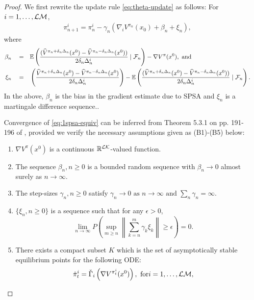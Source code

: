 \begin{proof}

We first rewrite the update rule \eqref{eq:theta-update} as follows: For $i=1,\ldots,\mathcal{L}\mathcal{M}$,
\begin{align}
\pi^{i}_{n+1}  =  \pi^{i}_n -  \gamma_n(\nabla_{i} V^{\pi_n}(x_0) + \beta_n + \xi_n), 
\label{eq:1spsa-equiv}
\end{align}
where 
\begin{align*}
\beta_n \quad= &\quad \mathbb{E}\left(\dfrac{(\widehat V^{\pi_n + \delta_n \Delta_n}(x^0) -\widehat V^{\pi_n - \delta_n \Delta_n}(x^0))}{2 \delta_n \Delta_n^{i}} \mid \mathcal{F}_n \right) - \nabla V^\pi(x^0), \text{ and}\\
\xi_n \quad = & \quad\left(\dfrac{\widehat V^{\pi_n + \delta_n \Delta_n}(x^0) -\widehat V^{\pi_n - \delta_n \Delta_n}(x^0)}{2 \delta_n\Delta_n^{i}}\right)  - \mathbb{E}\left(\dfrac{(\widehat V^{\pi_n + \delta_n \Delta_n}(x^0) -\widehat V^{\pi_n - \delta_n \Delta_n}(x^0))}{2 \delta_n \Delta_n^{i}}\mid \mathcal{F}_n \right).
\end{align*}
In the above, $\beta_n$ is the bias in the gradient estimate due to SPSA and $\xi_n$ is a martingale difference sequence..

Convergence of \eqref{eq:1spsa-equiv} can be inferred from Theorem 5.3.1 on pp. 191-196 of \cite{kushner-clark}, provided we verify the necessary assumptions given as (B1)-(B5) below:
\begin{enumerate}[\bfseries (B1)]
\item $\nabla V^\pi(x^0)$ is a continuous $\mathbb{R}^{\mathcal{L}\mathcal{K}}$-valued function.
\item  The sequence $\beta_n,n\geq 0$ is a bounded random sequence with
$\beta_n \rightarrow 0$ almost surely as $n\rightarrow \infty$.
\item The step-sizes $\gamma_n,n\geq 0$ satisfy
$  \gamma_n\rightarrow 0 \mbox{ as }n\rightarrow\infty \text{ and } \sum_n \gamma_n=\infty.$
\item $\{\xi_n, n\ge 0\}$ is a sequence such that for any $\epsilon>0$,
\[ \lim_{n\rightarrow\infty} P\left( \sup_{m\geq n}  \left\|
\sum_{k=n}^{m} \gamma_k \xi_k\right\| \geq \epsilon \right) = 0. \]
\item There exists a compact subset $K$ which is the set of asymptotically stable equilibrium points for the following ODE:
\begin{align}
\dot\pi^{i}_t = \check\Gamma_{i}\left( \nabla V^{\pi^{i}_t}(x^0)\right), \text{ for} i=1,\dots,\mathcal{L}\mathcal{M},\label{eq:pi-ode}
\end{align}
\end{enumerate} 


\end{proof}
